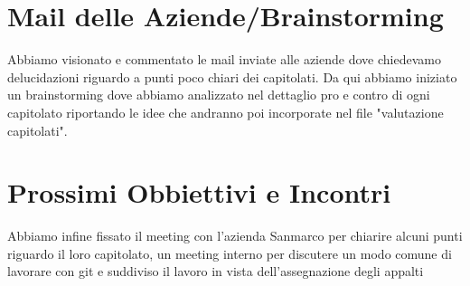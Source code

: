 \documentclass[12pt,a4paper]{article}
\begin{document}
\section{Mail delle Aziende/Brainstorming}
Abbiamo visionato e commentato le mail inviate alle aziende dove 
chiedevamo delucidazioni riguardo a punti poco chiari dei capitolati. 
Da qui abbiamo iniziato un brainstorming dove abbiamo analizzato 
nel dettaglio pro e contro di ogni capitolato riportando le idee 
che andranno poi incorporate nel file "valutazione capitolati".

\section{Prossimi Obbiettivi e Incontri}
Abbiamo infine fissato il meeting con l'azienda Sanmarco per chiarire 
alcuni punti riguardo il loro capitolato, un meeting interno per discutere 
un modo comune di lavorare con git e suddiviso il lavoro in vista dell'assegnazione 
degli appalti
\end{document}

